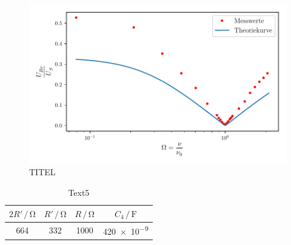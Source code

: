 \begin{figure}[h]
  \centering
  \includegraphics{plot.pdf}
   \caption{TITEL}
   \label{fig:plot}
\end{figure}


\begin{table}[h]
\normalsize
\centering
{}
\begin{tabular}{c c c c}
\toprule
        $2R' \,/\,\si{\ohm}$ & $R' \,/\,\si{\ohm}$ & $R \,/\,\si{\ohm}$ & $C_{4} \,/\, \si{\farad}$ \\
        \midrule
        664 & 332 & 1000 & \num{420e-9} \\
\bottomrule
\end{tabular}
\caption{Text5} 
\label{tab:6}
\end{table}


